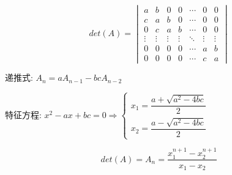 \begin{proposition}[三对角型行列式]
	$$det(A) = \begin{vmatrix}
		a      & b      & 0      & 0      & \cdots & 0      & 0\\
		c      & a      & b      & 0      & \cdots & 0      & 0\\
		0      & c      & a      & b      & \cdots & 0      & 0\\
		\vdots & \vdots & \vdots & \vdots & \ddots & \vdots & \vdots\\
		0      & 0      & 0      & 0      & \cdots & a      & b\\
		0      & 0      & 0      & 0      & \cdots & c      & a
	\end{vmatrix}$$

	递推式: $A_{n} = a A_{n-1} - bc A_{n-2}$

	特征方程: $x^{2} - ax + bc = 0\Rightarrow 
	\begin{cases}
		x_{1} = \dfrac{a + \sqrt{a^{2}-4bc}}{2}\\
		x_{2} = \dfrac{a - \sqrt{a^{2}-4bc}}{2}
	\end{cases}$

	$$det(A) = A_{n} = \dfrac{x_{1}^{n+1} - x_{2}^{n+1}}{x_{1}-x_{2}}$$
\end{proposition}

